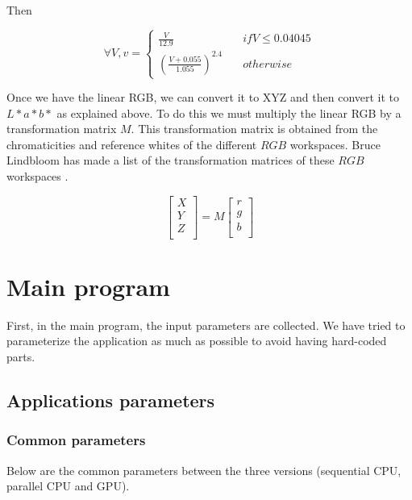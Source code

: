 \documentclass[titlepage,12pt]{report}
\begin{document}
Then

\begin{equation}
\forall V, v = \begin{cases} 
\frac{V}{12.9} & \quad if V \leq 0.04045 \\
\left( \frac{V + 0.055}{1.055} \right)^{2.4} & \quad otherwise
\end{cases}
\end{equation}

Once we have the linear RGB, we can convert it to XYZ and then convert it to $L*a*b*$ as explained above. To do this we must multiply the linear RGB by a transformation matrix $M$. This transformation matrix is obtained from the chromaticities and reference whites of the different $RGB$ workspaces. Bruce Lindbloom has made a list of the transformation matrices of these $RGB$ workspaces \citep{lindbloom_2017}.

\begin{equation}
\begin{bmatrix}
X \\ Y \\ Z\\ 
\end{bmatrix}
=
M
\begin{bmatrix}
r \\ g \\ b \\
\end{bmatrix}
\end{equation}

\section{Main program}

First, in the main program, the input parameters are collected. We have tried to parameterize the application as much as possible to avoid having hard-coded parts.

\subsection{Applications parameters}

\subsubsection{Common parameters}

Below are the common parameters between the three versions (sequential CPU, parallel CPU and GPU).
\end{document}
